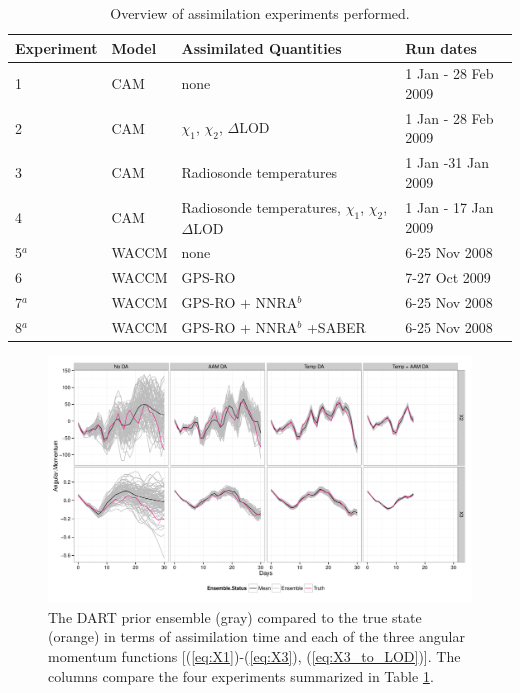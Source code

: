 
\begin{table}
\caption{Overview of assimilation experiments performed.}
\centering
\begin{tabular}{p{2cm}p{2cm}p{6cm}p{4cm}}
	Experiment& Model &  Assimilated Quantities  & Run dates \\
\hline
1 & CAM	&	none &  1 Jan - 28 Feb 2009 \\
2 & CAM &	$\chi_1$, $\chi_2$, $\Delta$LOD	& 1 Jan - 28 Feb 2009 \\
3 & CAM &	Radiosonde temperatures	& 1 Jan -31 Jan 2009	\\
4 & CAM &	Radiosonde temperatures, $\chi_1$, $\chi_2$, $\Delta$LOD	& 1 Jan - 17 Jan 2009\\
5$^a$ & WACCM &	none   & 6-25 Nov 2008	\\
6 & WACCM &	GPS-RO  & 7-27 Oct 2009	\\
7$^a$ & WACCM &	GPS-RO + NNRA$^b$  & 6-25 Nov 2008	\\
8$^a$ & WACCM &	GPS-RO + NNRA$^b$ +SABER & 6-25 Nov 2008\\	
\hline
\end{tabular}
\label{tab:expts}
\end{table}


 \begin{figure}
\includegraphics[width=\textwidth]{Paper_figures/ERPDA_paper_erpda_obs_space.pdf} 
 \caption{ The DART prior ensemble (gray) compared to the true state (orange) in terms of assimilation time and each of the three angular momentum functions [(\ref{eq:X1})-(\ref{eq:X3}), (\ref{eq:X3_to_LOD})].  The columns compare the four experiments summarized in Table \ref{tab:expts}.  }
 \label{fig:fit_to_ERPs}
\end{figure}

